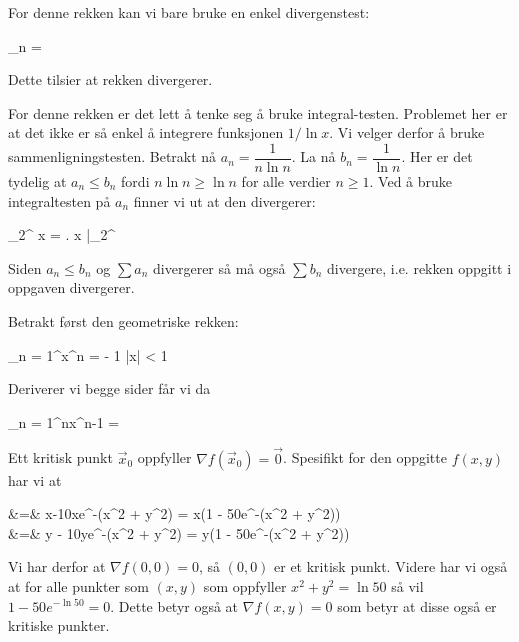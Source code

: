 \oppgave
\deloppgave
For denne rekken kan vi bare bruke en enkel divergenstest:
\begin{likning}
	\lim_{n \to \infty}  = 
\end{likning}
Dette tilsier at rekken divergerer.

\deloppgave
For denne rekken er det lett å tenke seg å bruke integral-testen. Problemet her er at det ikke er så enkel å integrere funksjonen $1/\ln x$. Vi velger derfor å bruke sammenligningstesten. Betrakt nå $a_n = \dfrac{1}{n\ln n}$. La nå $b_n = \dfrac{1}{\ln n}$. Her er det tydelig at $a_n \leq b_n$ fordi $n\ln n \geq \ln n$ for alle verdier $n \geq 1$. Ved å bruke integraltesten på $a_n$ finner vi ut at den divergerer:
\begin{utregning}
	\int_2^\infty {} \dd x = \left. \ln x \right|_2^\infty \to \infty
\end{utregning}
Siden $a_n \leq b_n$ og $\sum a_n$ divergerer så må også $\sum b_n$ divergere, i.e. rekken oppgitt i oppgaven divergerer.

\deloppgave
Betrakt først den geometriske rekken:
\begin{likning}
	\sum_{n = 1}^\infty x^n =  - 1 \qquad |x| < 1
\end{likning}
Deriverer vi begge sider får vi da
\begin{utregning}
	\sum_{n = 1}^\infty nx^{n-1} = 
\end{utregning}

\oppgave
\deloppgave
Ett kritisk punkt $\vec{x}_0$ oppfyller $\nabla f(\vec{x}_0) = \vec{0}$. Spesifikt for den oppgitte $f(x, y)$ har vi at
\begin{utregning}
	 &=& x-10xe^{-(x^2 + y^2)} = x\left(1 - 50e^{-(x^2 + y^2)}\right)\\
	 &=& y - 10ye^{-(x^2 + y^2)} = y\left(1 - 50e^{-(x^2 + y^2)}\right)
\end{utregning}
Vi har derfor at $\nabla f(0,0) = 0$, så $(0,0)$ er et kritisk punkt. Videre har vi også at for alle punkter som $(x, y)$ som oppfyller $x^2 + y^2 = \ln 50$ så vil $1 - 50e^{-\ln 50} = 0$. Dette betyr også at $\nabla f(x, y) = 0$ som betyr at disse også er kritiske punkter.

